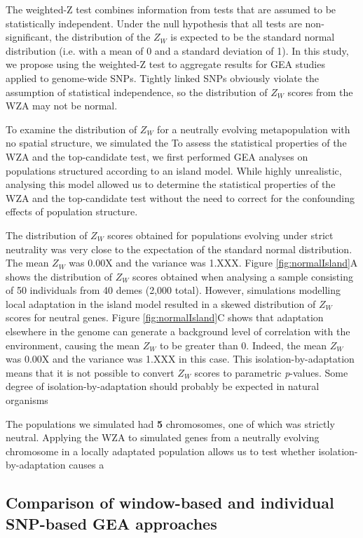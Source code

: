 \documentclass[10pt,twoside,lineno, twocolumn]{GSA_format}
\begin{document}
The weighted-Z test combines information from tests that are assumed to be statistically independent. Under the null hypothesis that all tests are non-significant, the distribution of the $Z_W$ is expected to be the standard normal distribution (i.e. with a mean of 0 and a standard deviation of 1). In this study, we propose using the weighted-Z test to aggregate results for GEA studies applied to genome-wide SNPs. Tightly linked SNPs obviously violate the assumption of statistical independence, so the distribution of $Z_W$ scores from the WZA may not be normal. 

To examine the distribution of $Z_W$ for a neutrally evolving metapopulation with no spatial structure, we simulated the  
To assess the statistical properties of the WZA and the top-candidate test, we first performed GEA analyses on populations structured according to an island model. While highly unrealistic, analysing this model allowed us to determine the statistical properties of the WZA and the top-candidate test without the need to correct for the confounding effects of population structure. 

The distribution of $Z_W$ scores obtained for populations evolving under strict neutrality was very close to the expectation of the standard normal distribution. The mean $Z_W$ was 0.00X and the variance was 1.XXX. Figure \ref{fig:normalIsland}A shows the distribution of $Z_W$ scores obtained when analysing a sample consisting of 50 individuals from 40 demes (2,000 total).  However, simulations modelling local adaptation in the island model resulted in a skewed distribution of $Z_W$ scores for neutral genes. Figure \ref{fig:normalIsland}C shows that adaptation elsewhere in the genome can generate a background level of correlation with the environment, causing the mean $Z_W$ to be greater than 0. Indeed, the mean $Z_W$ was 0.00X and the variance was 1.XXX in this case. This isolation-by-adaptation means that it is not possible to convert $Z_W$ scores to parametric \textit{p}-values. 
Some degree of isolation-by-adaptation should probably be expected in natural organisms

The populations we simulated had \textbf{5} chromosomes, one of which was strictly neutral. Applying the WZA to simulated genes from a neutrally evolving chromosome in a locally adaptated population allows us to test whether isolation-by-adaptation causes a 



\subsection{Comparison of window-based and individual SNP-based GEA approaches}
\end{document}
